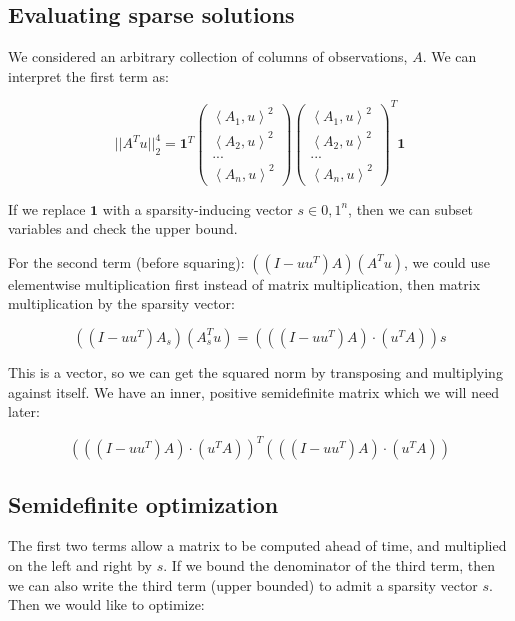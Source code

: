 \documentclass{article}
\begin{document}
\subsection{Evaluating sparse solutions}

We considered an arbitrary collection of columns of observations, $A$. We can interpret the first term as:

$$
|| A^T u ||^4_2
=
\mathbf{1}^T
\left(
    \begin{matrix}
        \left< A_1, u \right>^2 \\
        \left< A_2, u \right>^2 \\
        ... \\
        \left< A_n, u \right>^2
    \end{matrix}
\right)
\left(
    \begin{matrix}
        \left< A_1, u \right>^2 \\
        \left< A_2, u \right>^2 \\
        ... \\
        \left< A_n, u \right>^2
    \end{matrix}
\right)^T
\mathbf{1}
$$

If we replace $\mathbf{1}$ with a sparsity-inducing vector $s \in {0,1}^n$, then we can subset variables and check the upper bound.

For the second term (before squaring): $((I-uu^T) A) (A^T u)$, we could use elementwise multiplication first instead of matrix multiplication, then matrix multiplication by the sparsity vector:

$$
((I - uu^T) A_s) (A_s^T u)
= (((I - uu^T) A) \cdot (u^T A)) s
$$

This is a vector, so we can get the squared norm by transposing and multiplying against itself. We have an inner, positive semidefinite matrix which we will need later:

$$
(((I - uu^T) A) \cdot (u^T A))^T (((I - uu^T) A) \cdot (u^T A))
$$

\subsection{Semidefinite optimization}

The first two terms allow a matrix to be computed ahead of time, and multiplied on the left and right by $s$. If we bound the denominator of the third term, then we can also write the third term (upper bounded) to admit a sparsity vector $s$. Then we would like to optimize:
\end{document}

